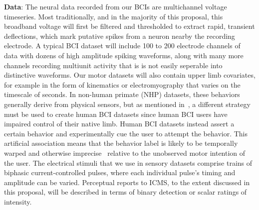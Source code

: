 \documentclass[12pt,oneside]{report}
\begin{document}
\textbf{Data}:
The neural data recorded from our BCIs are multichannel voltage timeseries. Most traditionally, and in the majority of this proposal, this broadband voltage will first be filtered and thresholded to extract rapid, transient deflections, which mark putative spikes from a neuron nearby the recording electrode. A typical BCI dataset will include 100 to 200 electrode channels of data with dozens of high amplitude spiking waveforms, along with many more channels recording multiunit activity that is is not easily seperable into distinctive waveforms. Our motor datasets will also contain upper limb covariates, for example in the form of kinematics or electromyography that varies on the timescale of seconds. In non-human primate (NHP) datasets, these behaviors generally derive from physical sensors, but as mentioned in~, a different strategy must be used to create human BCI datasets since human BCI users have impaired control of their native limb. Human BCI datasets instead assert a certain behavior and experimentally cue the user to attempt the behavior. This artificial association means that the behavior label is likely to be temporally warped and otherwise imprecise~\citep{merel2016neuroprosthetic} relative to the unobserved motor intention of the user.
The electrical stimuli that we use in sensory datasets comprise trains of biphasic current-controlled pulses, where each individual pulse’s timing and amplitude can be varied. Perceptual reports to ICMS, to the extent discussed in this proposal, will be described in terms of binary detection or scalar ratings of intensity.
\end{document}

